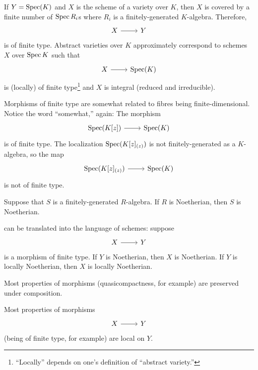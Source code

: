 \documentclass [11 pt, oneside] {article}
\begin{document}
If $Y=\operatorname{Spec} (K)$ and $X $ is the scheme of a variety over $K$, then $X$ is covered by a finite number of $\operatorname{Spec} R_i$s where $R_i$ is a finitely-generated $K$-algebra. Therefore, 
\[
\begin{tikzcd}
X\ar[r]& Y
\end{tikzcd}
\]
is of finite type. Abstract varieties over $K$ approximately correspond to schemes $X$ over $\operatorname{Spec} K$ such that
\[
\begin{tikzcd}
X\ar[r]& \Spec(K)
\end{tikzcd}
\]
is (locally) of finite type\footnote{``Locally'' depends on one's definition of ``abstract variety.''} and $X$ is integral (reduced and irreducible). 

Morphisms of finite type are somewhat related to fibres being finite-dimensional. Notice the word ``somewhat,'' again: The morphism
\[
\begin{tikzcd}
\Spec(K[z]) \ar[r]&\Spec(K)
\end{tikzcd}
\]
is of finite type. The localization $\operatorname{Spec} (K[z]_{(z)})$ is not finitely-generated as a $K$-algebra, so the map 
\[
\begin{tikzcd}
\Spec (K[z]_{(z)} )\ar[r]& \Spec (K) 
\end{tikzcd}
\]
is not of finite type.

\begin{theorem}[Hilbert]\label{htheo}\text{}
Suppose that $S$ is a finitely-generated $R$-algebra. If $R$ is Noetherian, then $S$ is Noetherian.
\end{theorem}

\begin{remark}
	 can be translated into the language of schemes: suppose 
	\[
\begin{tikzcd}
X\ar[r]&  Y
\end{tikzcd}
\]
	 is a morphism of finite type. If $Y$ is Noetherian, then $X$ is Noetherian. If $Y$ is locally Noetherian, then $X$ is locally Noetherian.
\end{remark}

\begin{remark}
	Most properties of morphisms (quasicompactness, for example) are preserved under composition.
\end{remark}

\begin{remark}
	Most properties of morphisms 
	\[
\begin{tikzcd}
X\ar[r]& Y
\end{tikzcd}
\] 
(being of finite type, for example) are local on $Y$.
\end{remark}
\end{document}
